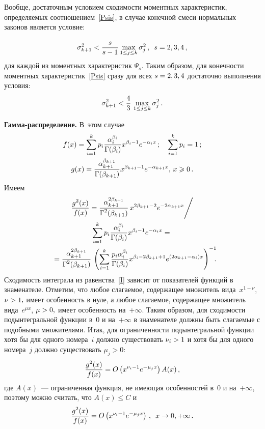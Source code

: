 \begin{multicols}{2}
Вообще, достаточным условием сходимости моментных характеристик,
определяемых соотношением~\eqref{Psis}, в случае конечной смеси
нормальных законов является условие:

\noindent
$$
\sigma_{k+1}^2<\displaystyle\frac{\displaystyle s\mathstrut}{\displaystyle s-1\mathstrut}\max_{1\le j\le
k}\sigma_j^2\,,\enskip s=2,3,4\,,
$$
для каждой из моментных характеристик $\Psi_s$. Таким образом, для
конечности моментных характеристик~\eqref{Psis} сразу для всех
$s\hm=2,3,4$ достаточно выполнения условия:
\begin{equation}
\label{CondPsiNorm} 
\sigma_{k+1}^2<\displaystyle\frac{\displaystyle 4\mathstrut}{\displaystyle 3\mathstrut}\,\max_{1\le j\le
k}\sigma_j^2\,.
\end{equation}

\textbf{Гамма-распределение.} В~этом случае
\begin{gather*}
f(x)=\sum\limits_{i=1}^{k}p_i\displaystyle\frac{\displaystyle \alpha_i^{\beta_i}\mathstrut}{\displaystyle \Gamma(\beta_i)\mathstrut}x^{\beta_i-1}e^{-\alpha_ix}\,;
\quad\sum\limits_{i=1}^{k}p_i=1\,;\\
g(x)=\displaystyle\frac{\displaystyle \alpha_{k+1}^{\beta_{k+1}}\mathstrut}{\displaystyle \Gamma(\beta_{k+1})\mathstrut}x^{\beta_{k+1}-1}e^{-\alpha_{k+1}x},\,x\geqslant0\,.
\end{gather*}
Имеем
\begin{multline*}
\displaystyle\frac{\displaystyle g^2(x)\mathstrut}{\displaystyle f(x)\mathstrut}=\displaystyle\frac{\displaystyle \alpha_{k+1}^{2\beta_{k+1}}\mathstrut}{\displaystyle \Gamma^2(\beta_{k+1})\mathstrut}\,x^{2\beta_{k+1}-2}e^{-2\alpha_{k+1}x}\Bigg/\\
{\sum\limits_{i=1}^{k}p_i \displaystyle\frac{\displaystyle \alpha_i^{\beta_i}\mathstrut}{\displaystyle \Gamma(\beta_i)\mathstrut}x^{\beta_i-1}e^{-\alpha_ix}}={}\\
\!{}=\displaystyle\frac{\displaystyle \alpha_{k+1}^{2\beta_{k+1}}\mathstrut}{\displaystyle \Gamma^2(\beta_{k+1})\mathstrut}\,
\left({\sum\limits_{i=1}^{k}\displaystyle\frac{\displaystyle p_i\alpha_i^{\beta_i}\mathstrut}{\displaystyle \Gamma(\beta_i)\mathstrut}
{x^{\beta_i-2\beta_{k+1}+1}
e^{\left(2\alpha_{k+1}-\alpha_i\right)x}}}\right)^{-1}\!\!\!.\hspace*{-7.35753pt}
\end{multline*}
Сходимость интеграла из равенства~\eqref{I} зависит от показателей
функций в знаменателе. Отметим, что любое слагаемое, содержащее
множитель вида~$x^{1-\nu}$, $\nu\hm>1,$ имеет особенность в нуле, а
любое слагаемое, содержащее множитель вида~$e^{\mu x}$, $\mu\hm>0,$
имеет особенность на~$+\infty$. Таким образом, для сходимости
подынтегральной функции в~$0$ и на~$+\infty$ в знаменателе должны
быть слагаемые с подобными множителями. Итак, для ограниченности
подынтегральной функции хотя бы для одного номера~$i$ должно
существовать $\nu_i\hm>1$ и хотя бы для одного номера~$j$ должно
существовать $\mu_j>0$:
\begin{equation*}
\displaystyle\frac{\displaystyle g^2(x)\mathstrut}{\displaystyle f(x)\mathstrut}=O\left(x^{\nu_i-1}e^{-\mu_j x}\right) A(x)\,,
\end{equation*}
где $A(x)$~--- ограниченная функция, не имеющая особенностей в~0 
и на~$+\infty$, поэтому можно считать, что $A(x)\leqslant C$ и
\begin{equation*}
\displaystyle\frac{\displaystyle g^2(x)\mathstrut}{\displaystyle f(x)\mathstrut}=O\left(x^{\nu_i-1}e^{-\mu_j x}\right)\,,\enskip x\to0,+\infty\,.
\end{equation*}


\end{multicols}

